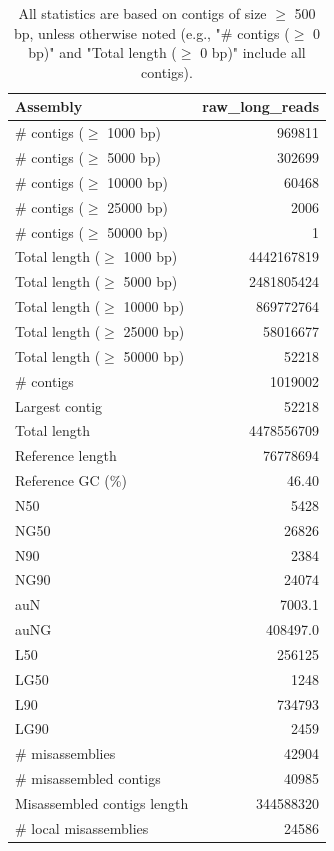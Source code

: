\documentclass[12pt,a4paper]{article}
\begin{document}
\begin{table}[ht]
\begin{center}
\caption{All statistics are based on contigs of size $\geq$ 500 bp, unless otherwise noted (e.g., "\# contigs ($\geq$ 0 bp)" and "Total length ($\geq$ 0 bp)" include all contigs).}
\begin{tabular}{|l*{1}{|r}|}
\hline
Assembly & raw\_long\_reads \\ \hline
\# contigs ($\geq$ 1000 bp) & 969811 \\ \hline
\# contigs ($\geq$ 5000 bp) & 302699 \\ \hline
\# contigs ($\geq$ 10000 bp) & 60468 \\ \hline
\# contigs ($\geq$ 25000 bp) & 2006 \\ \hline
\# contigs ($\geq$ 50000 bp) & 1 \\ \hline
Total length ($\geq$ 1000 bp) & 4442167819 \\ \hline
Total length ($\geq$ 5000 bp) & 2481805424 \\ \hline
Total length ($\geq$ 10000 bp) & 869772764 \\ \hline
Total length ($\geq$ 25000 bp) & 58016677 \\ \hline
Total length ($\geq$ 50000 bp) & 52218 \\ \hline
\# contigs & 1019002 \\ \hline
Largest contig & 52218 \\ \hline
Total length & 4478556709 \\ \hline
Reference length & 76778694 \\ \hline
Reference GC (\%) & 46.40 \\ \hline
N50 & 5428 \\ \hline
NG50 & 26826 \\ \hline
N90 & 2384 \\ \hline
NG90 & 24074 \\ \hline
auN & 7003.1 \\ \hline
auNG & 408497.0 \\ \hline
L50 & 256125 \\ \hline
LG50 & 1248 \\ \hline
L90 & 734793 \\ \hline
LG90 & 2459 \\ \hline
\# misassemblies & 42904 \\ \hline
\# misassembled contigs & 40985 \\ \hline
Misassembled contigs length & 344588320 \\ \hline
\# local misassemblies & 24586 \\ \hline

\end{tabular}
\end{center}
\end{table}
\end{document}

